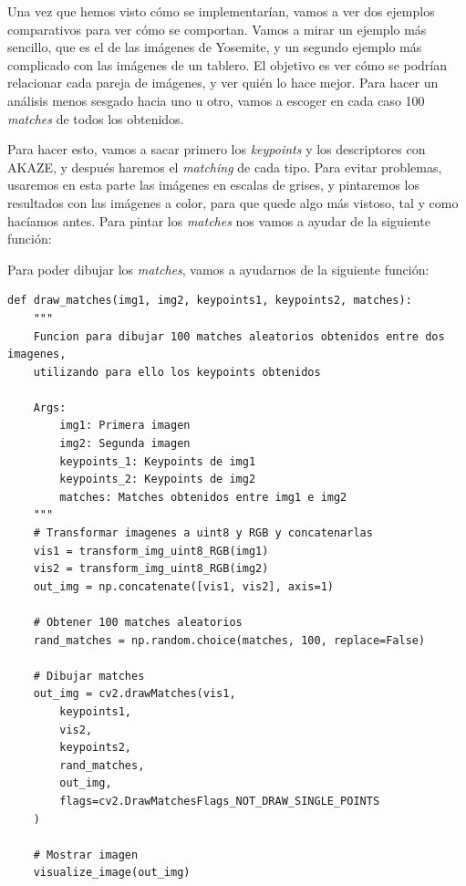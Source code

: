 \documentclass[11pt,a4paper]{article}
\begin{document}
Una vez que hemos visto cómo se implementarían, vamos a ver dos ejemplos comparativos
para ver cómo se comportan. Vamos a mirar un ejemplo más sencillo, que es el de las imágenes
de Yosemite, y un segundo ejemplo más complicado con las imágenes de un tablero. El objetivo
es ver cómo se podrían relacionar cada pareja de imágenes, y ver quién lo hace mejor. Para hacer
un análisis menos sesgado hacia uno u otro, vamos a escoger en cada caso 100 \textit{matches}
de todos los obtenidos.

Para hacer esto, vamos a sacar primero los \textit{keypoints} y los descriptores con AKAZE,
y después haremos el \textit{matching} de cada tipo. Para evitar problemas, usaremos en esta parte
las imágenes en escalas de grises, y pintaremos los resultados con las imágenes a color, para que quede
algo más vistoso, tal y como hacíamos antes. Para pintar los \textit{matches} nos vamos a ayudar de la
siguiente función:

Para poder dibujar los \textit{matches}, vamos a ayudarnos de la siguiente función:

\begin{lstlisting}
def draw_matches(img1, img2, keypoints1, keypoints2, matches):
    """
    Funcion para dibujar 100 matches aleatorios obtenidos entre dos imagenes,
    utilizando para ello los keypoints obtenidos

    Args:
        img1: Primera imagen
        img2: Segunda imagen
        keypoints_1: Keypoints de img1
        keypoints_2: Keypoints de img2
        matches: Matches obtenidos entre img1 e img2
    """
    # Transformar imagenes a uint8 y RGB y concatenarlas
    vis1 = transform_img_uint8_RGB(img1)
    vis2 = transform_img_uint8_RGB(img2)
    out_img = np.concatenate([vis1, vis2], axis=1)

    # Obtener 100 matches aleatorios
    rand_matches = np.random.choice(matches, 100, replace=False)

    # Dibujar matches
    out_img = cv2.drawMatches(vis1,
        keypoints1,
        vis2,
        keypoints2,
        rand_matches,
        out_img,
        flags=cv2.DrawMatchesFlags_NOT_DRAW_SINGLE_POINTS
    )

    # Mostrar imagen
    visualize_image(out_img)
\end{lstlisting}
\end{document}
